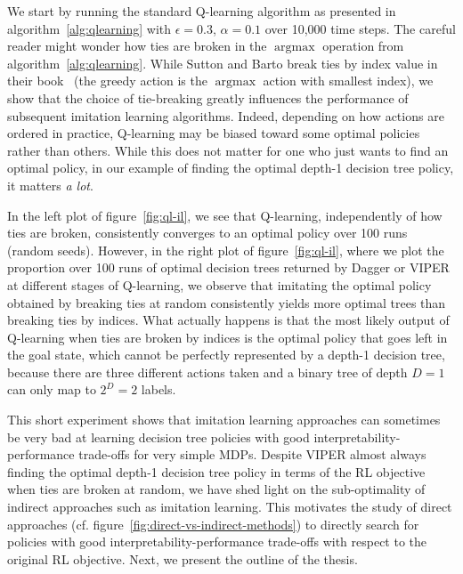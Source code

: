 We start by running the standard Q-learning algorithm as presented in algorithm~\ref{alg:qlearning} with $\epsilon=0.3$, $\alpha=0.1$ over 10,000 time steps.
The careful reader might wonder how ties are broken in the $\operatorname{argmax}$ operation from algorithm~\ref{alg:qlearning}.
While Sutton and Barto break ties by index value in their book~\cite{sutton} (the greedy action is the $\operatorname{argmax}$ action with smallest index), we show that the choice of tie-breaking greatly influences the performance of subsequent imitation learning algorithms.
Indeed, depending on how actions are ordered in practice, Q-learning may be biased toward some optimal policies rather than others.
While this does not matter for one who just wants to find an optimal policy, in our example of finding the optimal depth-1 decision tree policy, it matters \textit{a lot}.

In the left plot of figure~\ref{fig:ql-il}, we see that Q-learning, independently of how ties are broken, consistently converges to an optimal policy over 100 runs (random seeds).
However, in the right plot of figure~\ref{fig:ql-il}, where we plot the proportion over 100 runs of optimal decision trees returned by Dagger or VIPER at different stages of Q-learning, we observe that imitating the optimal policy obtained by breaking ties at random consistently yields more optimal trees than breaking ties by indices.
What actually happens is that the most likely output of Q-learning when ties are broken by indices is the optimal policy that goes left in the goal state,
which cannot be perfectly represented by a depth-1 decision tree, because there are three different actions taken and a binary tree of depth $D=1$ can only map to $2^D=2$ labels.

This short experiment shows that imitation learning approaches can sometimes be very bad at learning decision tree policies with good interpretability-performance trade-offs for very simple MDPs. 
Despite VIPER almost always finding the optimal depth-1 decision tree policy in terms of the RL objective when ties are broken at random, we have shed light on the sub-optimality of indirect approaches such as imitation learning.
This motivates the study of direct approaches (cf. figure~\ref{fig:direct-vs-indirect-methods}) to directly search for policies with good interpretability-performance trade-offs with respect to the original RL objective.
Next, we present the outline of the thesis.

